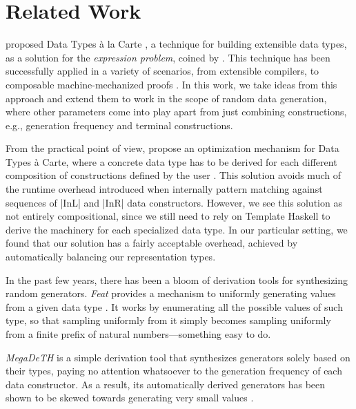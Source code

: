 \section{Related Work}
\label{sec:related}

\citeauthor{SwierstraDTC} proposed Data Types \`a la Carte \cite{SwierstraDTC},
a technique for building extensible data types, as a solution for the
\emph{expression problem}, coined by \citeauthor{wadler1998expression}
\cite{wadler1998expression}.
%
This technique has been successfully applied in a variety of scenarios, from
extensible compilers, to composable machine-mechanized proofs
\cite{Day:2013:CAL:2620678.2620680, persson2011generic, wu2014effect,
  delaware2013meta}.
%
In this work, we take ideas from this approach and extend them to work in the
scope of random data generation, where other parameters come into play apart
from just combining constructions, e.g., generation frequency and terminal
constructions.


From the practical point of view, \citeauthor{KiriyamaOptimizingDTC} propose an
optimization mechanism for Data Types \`a Carte, where a concrete data type has
to be derived for each different composition of constructions defined by the
user \cite{KiriyamaOptimizingDTC}.
%
This solution avoids much of the runtime overhead introduced when internally
pattern matching against sequences of |InL| and |InR| data constructors.
%
However, we see this solution as not entirely compositional, since we still need
to rely on Template Haskell to derive the machinery for each specialized data
type.
%
In our particular setting, we found that our solution has a fairly acceptable
overhead, achieved by automatically balancing our representation types.


In the past few years, there has been a bloom of derivation tools for
synthesizing random generators.
%
\emph{Feat} provides a mechanism to uniformly generating values from a given
data type \cite{DuregardJW12}.
%
It works by enumerating all the possible values of such type, so that sampling
uniformly from it simply becomes sampling uniformly from a finite prefix of
natural numbers---something easy to do.


\emph{MegaDeTH} is a simple derivation tool that synthesizes generators solely
based on their types, paying no attention whatsoever to the generation frequency
of each data constructor.
%
As a result, its automatically derived generators has been shown to be skewed
towards generating very small values
\cite{DBLP:conf/haskell/MistaRH18}.


